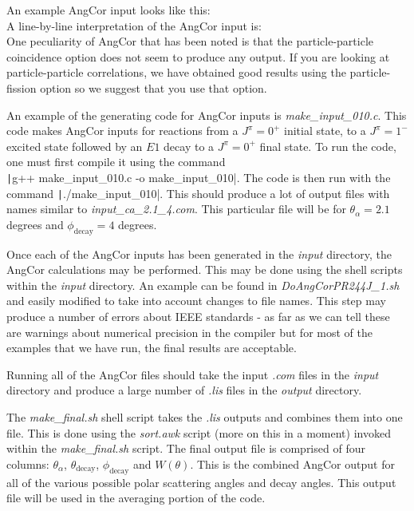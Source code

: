 \documentclass[a4paper,10pt]{article}
\begin{document}
An example AngCor input looks like this:\\


A line-by-line interpretation of the AngCor input is:\\

One peculiarity of AngCor that has been noted is that the particle-particle coincidence option does not seem to produce any output. If you are looking at particle-particle correlations, we have obtained good results using the particle-fission option so we suggest that you use that option.

An example of the generating code for AngCor inputs is {\it make\_input\_010.c}. This code makes AngCor inputs for reactions from a $J^\pi = 0^+$ initial state, to a $J^\pi = 1^-$ excited state followed by an $E1$ decay to a $J^\pi = 0^+$ final state. To run the code, one must first compile it using the command\\ \texttt|g++ make_input_010.c -o make_input_010|. The code is then run with the command \texttt|./make_input_010|. This should produce a lot of output files with names similar to {\it input\_ca\_2.1\_4.com}. This particular file will be for $\theta_\alpha = 2.1$ degrees and $\phi_\mathrm{decay} = 4$ degrees.

Once each of the AngCor inputs has been generated in the {\it input} directory, the AngCor calculations may be performed. This may be done using the shell scripts within the {\it input} directory. An example can be found in {\it DoAngCorPR244J\_1.sh} and easily modified to take into account changes to file names. This step may produce a number of errors about IEEE standards - as far as we can tell these are warnings about numerical precision in the compiler but for most of the examples that we have run, the final results are acceptable.

Running all of the AngCor files should take the input {\it .com} files in the {\it input} directory and produce a large number of {\it .lis} files in the {\it output} directory. 

The {\it make\_final.sh} shell script takes the {\it .lis} outputs and combines them into one file. This is done using the {\it sort.awk} script (more on this in a moment) invoked within the {\it make\_final.sh} script. The final output file is comprised of four columns: $\theta_\alpha$, $\theta_\mathrm{decay}$, $\phi_\mathrm{decay}$ and $W(\theta)$. This is the combined AngCor output for all of the various possible polar scattering angles and decay angles. This output file will be used in the averaging portion of the code.
\end{document}
